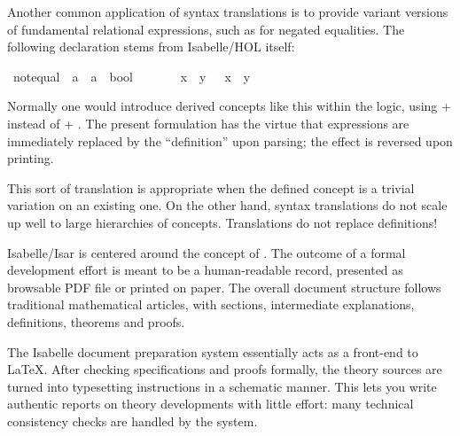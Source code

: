 \begin{isabellebody}
\begin{isamarkuptext}
  \medskip Another common application of syntax translations is to
  provide variant versions of fundamental relational expressions, such
  as \isa{{\isasymnoteq}} for negated equalities.  The following declaration
  stems from Isabelle/HOL itself:%
\end{isamarkuptext}%
\isamarkuptrue%
\ {\isachardoublequote}{\isacharunderscore}not{\isacharunderscore}equal{\isachardoublequote}\ {\isacharcolon}{\isacharcolon}\ {\isachardoublequote}{\isacharprime}a\ {\isasymRightarrow}\ {\isacharprime}a\ {\isasymRightarrow}\ bool{\isachardoublequote}\ \ \ \ {\isacharparenleft}\ {\isachardoublequote}{\isasymnoteq}{\isasymignore}{\isachardoublequote}\ {}{}{\isacharparenright}\isanewline
\isamarkupfalse%
\ {\isachardoublequote}x\ {\isasymnoteq}{\isasymignore}\ y{\isachardoublequote}\ {\isasymrightleftharpoons}\ {\isachardoublequote}{\isasymnot}\ {\isacharparenleft}x\ {\isacharequal}\ y{\isacharparenright}{\isachardoublequote}\isamarkupfalse%
%
\begin{isamarkuptext}%
\noindent Normally one would introduce derived concepts like this
  within the logic, using  + 
  instead of  + .  The
  present formulation has the virtue that expressions are immediately
  replaced by the ``definition'' upon parsing; the effect is reversed
  upon printing.

  This sort of translation is appropriate when the defined concept is
  a trivial variation on an existing one.  On the other hand, syntax
  translations do not scale up well to large hierarchies of concepts.
  Translations do not replace definitions!%
\end{isamarkuptext}%
\isamarkuptrue%
%
\isamarkuptrue%
%
\begin{isamarkuptext}%
Isabelle/Isar is centered around the concept of .  The outcome of a formal
  development effort is meant to be a human-readable record, presented
  as browsable PDF file or printed on paper.  The overall document
  structure follows traditional mathematical articles, with sections,
  intermediate explanations, definitions, theorems and proofs.

  \medskip The Isabelle document preparation system essentially acts
  as a front-end to {\LaTeX}.  After checking specifications and
  proofs formally, the theory sources are turned into typesetting
  instructions in a schematic manner.  This lets you write authentic
  reports on theory developments with little effort: many technical
  consistency checks are handled by the system.


\end{isamarkuptext}
\end{isabellebody}
